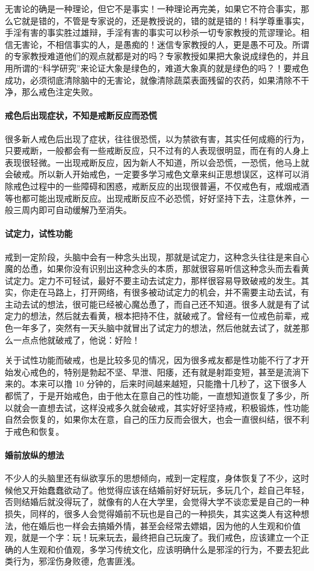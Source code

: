 无害论的确是一种理论，但它不是事实！一种理论再完美，如果它不符合事实，那么它就是错的，不管是专家说的，还是教授说的，错的就是错的！科学尊重事实，手淫有害的事实胜过雄辩，手淫有害的事实可以秒杀一切专家教授的荒谬理论。相信无害论，不相信事实的人，是愚痴的！迷信专家教授的人，更是愚不可及。所谓的专家教授难道他们的观点就都是对的吗？专家教授如果把大象说成绿色的，并且用所谓的“科学研究”来论证大象是绿色的，难道大象真的就是绿色的吗？！要戒色成功，必须彻底清除脑中的无害论，就像清除蔬菜表面残留的农药，如果清除不干净，那么戒色注定失败。

\paragraph{戒色后出现症状，不知是戒断反应而恐慌} 很多新人戒色后出现了症状，往往很恐慌，以为禁欲有害，其实任何成瘾的行为，只要戒断，一般都会有一些戒断反应，只不过有的人表现很明显，而在有的人身上表现很轻微。一出现戒断反应，因为新人不知道，所以会恐慌，一恐慌，他马上就会破戒。所以新人开始戒色，一定要多学习戒色文章来纠正思想误区，这样可以消除戒色过程中的一些障碍和困惑，戒断反应的出现很普遍，不仅戒色有，戒烟戒酒等也都可能出现戒断反应。出现戒断反应不必恐慌，好好坚持下去，注意休养，一般三周内即可自动缓解乃至消失。

\paragraph{试定力，试性功能} 戒到一定阶段，头脑中会有一种念头出现，那就是试定力，这种念头往往是来自心魔的怂恿，如果你没有识别出这种念头的本质，那就很容易听信这种念头而去看黄试定力。定力不可轻试，最好不要主动去试定力，那样很容易导致破戒的发生。其实，你走在马路上，打开网络，有很多被动试定力的机会，并不需要主动去试，有主动去试的想法，很可能已经被心魔怂恿了，而自己还不知道。很多人就是有了试定力的想法，然后就去看黄，根本把持不住，就破戒了。曾经有一位戒色前辈，戒色一年多了，突然有一天头脑中就冒出了试定力的想法，然后他就去试了，就差那么一点点他就破戒了，他说：好险！

关于试性功能而破戒，也是比较多见的情况，因为很多戒友都是性功能不行了才开始发心戒色的，特别是勃起不坚、早泄、阳痿，还有就是射距变短，甚至是流淌下来的。本来可以撸 10 分钟的，后来时间越来越短，只能撸十几秒了，这下很多人都慌了，于是开始戒色，由于他太在意自己的性功能，一直想知道恢复了多少，所以就会一直想去试，这样没戒多久就会破戒，其实好好坚持戒，积极锻炼，性功能自然会恢复的，如果你太在意，自己的压力反而会很大，也会一直很纠结，很不利于戒色和恢复。

\paragraph{婚前放纵的想法} 不少人的头脑里还有纵欲享乐的思想倾向，戒到一定程度，身体恢复了不少，这时候他又开始蠢蠢欲动了。他觉得应该在结婚前好好玩玩，多玩几个，趁自己年轻，否则结婚后就没得玩了，就像有的人在大学里，会觉得大学不谈恋爱是自己的一种损失，同样的，很多人会觉得婚前不玩也是自己的一种损失，其实这类人有这种想法，他在婚后也一样会去搞婚外情，甚至会经常去嫖娼，因为他的人生观和价值观，就是一个字：玩！玩来玩去，最终把自己玩废了。我们戒色，应该建立一个正确的人生观和价值观，多学习传统文化，应该明确什么是邪淫的行为，不要去犯此类行为，邪淫伤身败德，危害匪浅。

